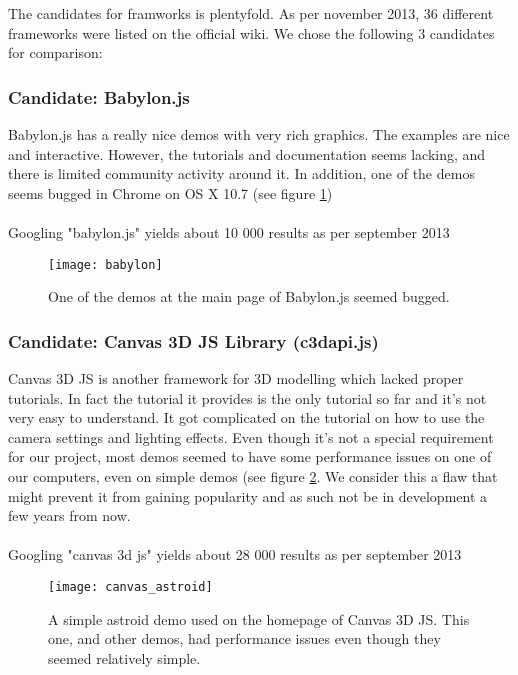 \documentclass{report}
\begin{document}
The candidates for framworks is plentyfold. As per november 2013, 36 different frameworks were listed on the official wiki\cite{website:webgl_frameworks}.  We chose the following 3 candidates for comparison:

\subsubsection{Candidate: Babylon.js}
Babylon.js\cite{website:babylon} has a really nice demos with very rich graphics. The examples are nice and interactive. However, the tutorials and documentation seems lacking, and there is limited community activity around it. In addition, one of the demos seems bugged in Chrome on OS X 10.7 (see figure \ref{fig:babylon.js}) \\ \\ 
Googling "babylon.js" yields about 10 000 results as per september 2013

\begin{figure}
    \centering
    \texttt{[image: babylon]}
    \caption{One of the demos at the main page of Babylon.js seemed bugged.}
    \label{fig:babylon.js}
\end{figure}

\subsubsection{Candidate: Canvas 3D JS Library (c3dapi.js)}
Canvas 3D JS\cite{website:c3dl} is another framework for 3D modelling which lacked proper tutorials. In fact the tutorial it provides is the only tutorial so far and it’s not very easy to understand. It got complicated on the tutorial on how to use the camera settings and lighting effects. Even though it's not a special requirement for our project, most demos seemed to have some performance issues on one of our computers, even on simple demos (see figure \ref{fig:canvas_astroid}. We consider this a flaw that might prevent it from gaining popularity and as such not be in development a few years from now.\\ \\ 
Googling "canvas 3d js" yields about 28 000 results as per september 2013

\begin{figure}
    \centering
    \texttt{[image: canvas\_astroid]}
    \caption{A simple astroid demo used on the homepage of Canvas 3D JS. This one, and other demos, had performance issues even though they seemed relatively simple.}
    \label{fig:canvas_astroid}
\end{figure}
\end{document}
